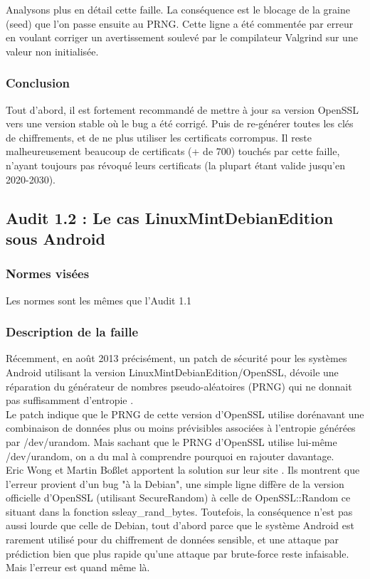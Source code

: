 			Analysons plus en détail cette faille. La conséquence est le blocage de la graine (seed) que l'on passe ensuite au PRNG. Cette ligne a été commentée par erreur en voulant corriger un avertissement soulevé par le compilateur Valgrind sur une valeur non initialisée.

		\subsubsection{Conclusion}
		
			Tout d'abord, il est fortement recommandé de mettre à jour sa version OpenSSL vers une version stable où le bug a été corrigé. Puis de re-générer toutes les clés de chiffrements, et de ne plus utiliser les certificats corrompus. Il reste malheureusement beaucoup de certificats (+ de 700) touchés par cette faille, n'ayant toujours pas révoqué leurs certificats (la plupart étant valide jusqu'en 2020-2030).
			
	\subsection{Audit 1.2 : Le cas LinuxMintDebianEdition sous Android}
		\subsubsection{Normes visées}
	
			Les normes sont les mêmes que l'Audit 1.1
		
		\subsubsection{Description de la faille}
		
			Récemment, en août 2013 précisément, un patch de sécurité pour les systèmes Android utilisant la version LinuxMintDebianEdition/OpenSSL, dévoile une réparation du générateur de nombres pseudo-aléatoires (PRNG) qui ne donnait pas suffisamment d'entropie \cite{alex2013android} \cite{bochum2013randomly}. \\ 

			Le patch indique que le PRNG de cette version d'OpenSSL utilise dorénavant une combinaison de données plus ou moins prévisibles associées à l'entropie générées par /dev/urandom. Mais sachant que le PRNG d'OpenSSL utilise lui-même /dev/urandom, on a du mal à comprendre pourquoi en rajouter davantage.\\
		
			Eric Wong et Martin Boßlet apportent la solution sur leur site \cite{boblet2013android}. Ils montrent que l'erreur provient d'un bug "à la Debian", une simple ligne diffère de la version officielle d'OpenSSL (utilisant SecureRandom) à celle de OpenSSL::Random ce situant dans la fonction ssleay\_rand\_bytes. Toutefois, la conséquence n'est pas aussi lourde que celle de Debian, tout d'abord parce que le système Android est rarement utilisé pour du chiffrement de données sensible, et une attaque par prédiction bien que plus rapide qu'une attaque par brute-force reste infaisable. Mais l'erreur est quand même là. \\
	
